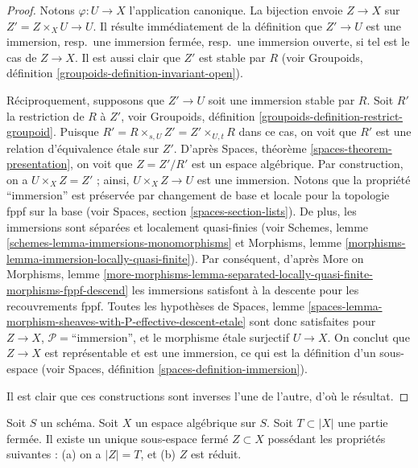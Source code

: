 \begin{proof}
Notons $\varphi : U \to X$ l'application canonique. La bijection envoie
$Z \to X$ sur $Z' = Z \times_X U \to U$. Il résulte immédiatement de la définition
que $Z' \to U$ est une immersion, resp.\ une immersion fermée, resp.\ une
immersion ouverte, si tel est le cas de $Z \to X$. Il est aussi clair que $Z'$ est stable par $R$
(voir Groupoids, définition \ref{groupoids-definition-invariant-open}).

\medskip\noindent
Réciproquement, supposons que $Z' \to U$ soit une immersion stable par $R$.
Soit $R'$ la restriction de $R$ à $Z'$, voir
Groupoids, définition \ref{groupoids-definition-restrict-groupoid}.
Puisque $R' = R \times_{s, U} Z' = Z' \times_{U, t} R$ dans ce cas,
on voit que $R'$ est une relation d'équivalence \'etale sur $Z'$. D'après
Spaces, théorème \ref{spaces-theorem-presentation}, on voit que
$Z = Z'/R'$ est un espace algébrique. Par construction, on a
$U \times_X Z = Z'$ ; ainsi, $U \times_X Z \to U$ est une immersion.
Notons que la propriété ``immersion'' est préservée par changement de base
et locale pour la topologie fppf sur la base (voir Spaces, section \ref{spaces-section-lists}).
De plus, les immersions sont séparées et localement quasi-finies (voir
Schemes, lemme \ref{schemes-lemma-immersions-monomorphisms}
et
Morphisms, lemme \ref{morphisms-lemma-immersion-locally-quasi-finite}).
Par conséquent, d'après More on Morphisms, lemme
\ref{more-morphisms-lemma-separated-locally-quasi-finite-morphisms-fppf-descend}
les immersions satisfont à la descente pour les recouvrements fppf. Toutes les hypothèses de
Spaces,
lemme \ref{spaces-lemma-morphism-sheaves-with-P-effective-descent-etale}
sont donc satisfaites pour $Z \to X$, $\mathcal{P}=$``immersion'',
et le morphisme \'etale surjectif $U \to X$. On conclut que $Z \to X$
est représentable et est une immersion, ce qui est la
définition d'un sous-espace (voir
Spaces, définition \ref{spaces-definition-immersion}).

\medskip\noindent
Il est clair que ces constructions sont inverses l'une de l'autre, d'où le résultat.
\end{proof}

\begin{lemma}
\label{lemma-reduced-closed-subspace}
Soit $S$ un schéma.
Soit $X$ un espace algébrique sur $S$.
Soit $T \subset |X|$ une partie fermée.
Il existe un unique sous-espace fermé $Z \subset X$ possédant
les propriétés suivantes : (a) on a $|Z| = T$, et (b) $Z$ est réduit.
\end{lemma}

